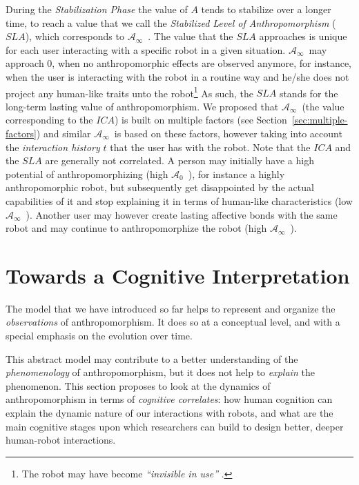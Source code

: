 \documentclass{frontiersSCNS} %
\newcommand{\ICA}{{$\mathcal{A}_0$~}}
\newcommand{\SLA}{{$\mathcal{A}_\infty$~}}
\begin{document}
During the \textit{Stabilization Phase} the value of $A$ tends to stabilize over
a longer time, to reach a value that we call the \textit{Stabilized Level of
Anthropomorphism} ($SLA$), which corresponds to \SLA. The value that the
$SLA$ approaches is unique for each user interacting with a specific robot in a
given situation. \SLA may approach $0$, when no anthropomorphic effects
are observed anymore, for instance, when the user is interacting with the robot
in a routine way and he/she does not project any human-like traits unto the
robot\footnote{The robot may have become \textit{``invisible in use''}
\citep{takayama_toward_2011}.} As such, the $SLA$ stands for the long-term
lasting value of anthropomorphism.  We proposed that \SLA (the value
corresponding to the $ICA$) is built on multiple factors (see
Section~\ref{sec:multiple-factors}) and similar \SLA is based on these
factors, however taking into account the \textit{interaction history} $t$ that
the user has with the robot.  Note that the $ICA$ and the $SLA$ are generally
not correlated. A person may initially have a high potential of
anthropomorphizing (high \ICA), for instance a highly anthropomorphic robot,
but subsequently get disappointed by the actual capabilities of it and stop
explaining it in terms of human-like characteristics (low \SLA). Another
user may however create lasting affective bonds with the same robot and may
continue to anthropomorphize the robot (high \SLA).



%
%
%
%
%
%

\section{Towards a Cognitive Interpretation}
\label{sec:cognition-neuroscience}

The model that we have introduced so far helps to represent and organize the
\emph{observations} of anthropomorphism. It does so at a conceptual level, and
with a special emphasis on the evolution over time.

This abstract model may contribute to a better understanding of the
\emph{phenomenology} of anthropomorphism, but it does not help to \emph{explain}
the phenomenon. This section proposes to look at the dynamics of
anthropomorphism in terms of \emph{cognitive correlates}: how human cognition
can explain the dynamic nature of our interactions with robots, and what are the
main cognitive stages upon which researchers can build to design better, deeper
human-robot interactions.
\end{document}
